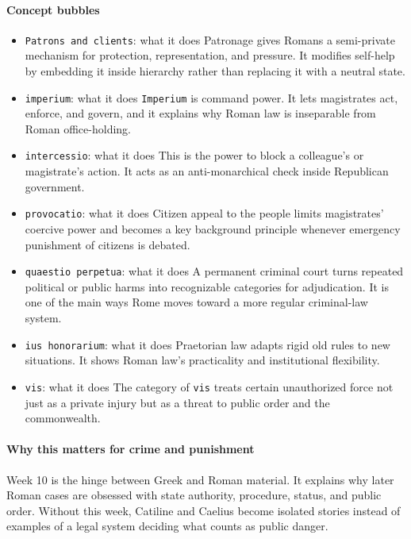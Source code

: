 \documentclass[11pt]{article}
\begin{document}
\paragraph{Concept bubbles}

\begin{itemize}
\item \texttt{Patrons and clients}: what it does Patronage gives Romans a semi-private mechanism for protection, representation, and pressure. It modifies self-help by embedding it inside hierarchy rather than replacing it with a neutral state.
\item \texttt{imperium}: what it does \texttt{Imperium} is command power. It lets magistrates act, enforce, and govern, and it explains why Roman law is inseparable from Roman office-holding.
\item \texttt{intercessio}: what it does This is the power to block a colleague's or magistrate's action. It acts as an anti-monarchical check inside Republican government.
\item \texttt{provocatio}: what it does Citizen appeal to the people limits magistrates' coercive power and becomes a key background principle whenever emergency punishment of citizens is debated.
\item \texttt{quaestio perpetua}: what it does A permanent criminal court turns repeated political or public harms into recognizable categories for adjudication. It is one of the main ways Rome moves toward a more regular criminal-law system.
\item \texttt{ius honorarium}: what it does Praetorian law adapts rigid old rules to new situations. It shows Roman law's practicality and institutional flexibility.
\item \texttt{vis}: what it does The category of \texttt{vis} treats certain unauthorized force not just as a private injury but as a threat to public order and the commonwealth.
\end{itemize}

\paragraph{Why this matters for crime and punishment}

Week 10 is the hinge between Greek and Roman material. It explains why later Roman cases are obsessed with state authority, procedure, status, and public order. Without this week, Catiline and Caelius become isolated stories instead of examples of a legal system deciding what counts as public danger.
\end{document}
